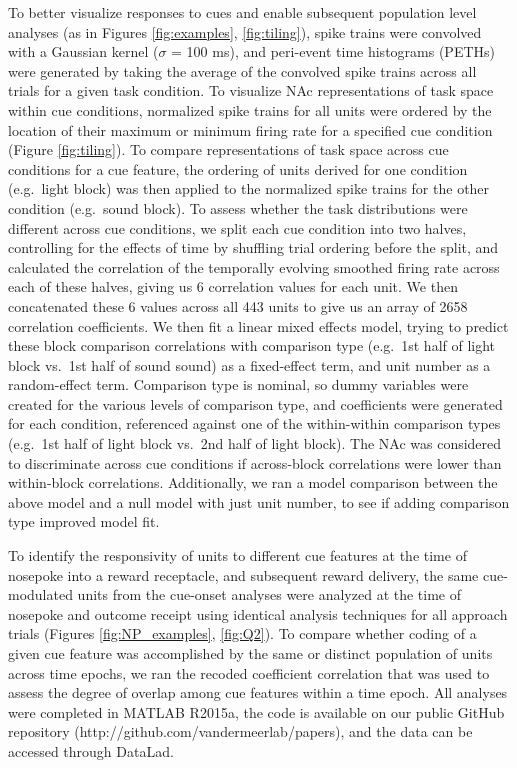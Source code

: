 \documentclass[11pt]{article}
\begin{document}
To better visualize responses to cues and enable subsequent population level analyses (as in Figures \ref{fig:examples}, \ref{fig:tiling}), spike trains were convolved with a Gaussian kernel ($\sigma$ = 100 ms), and peri-event time histograms (PETHs) were generated by taking the average of the convolved spike trains across all trials for a given task condition. To visualize NAc representations of task space within cue conditions, normalized spike trains for all units were ordered by the location of their maximum or minimum firing rate for a specified cue condition (Figure \ref{fig:tiling}). To compare representations of task space across cue conditions for a cue feature, the ordering of units derived for one condition (e.g.\ light block) was then applied to the normalized spike trains for the other condition (e.g.\ sound block). To assess whether the task distributions were different across cue conditions, we split each cue condition into two halves, controlling for the effects of time by shuffling trial ordering before the split, and calculated the correlation of the temporally evolving smoothed firing rate across each of these halves, giving us 6 correlation values for each unit. We then concatenated these 6 values across all 443 units to give us an array of 2658 correlation coefficients. We then fit a linear mixed effects model, trying to predict these block comparison correlations with comparison type (e.g.\ 1st half of light block vs.\ 1st half of sound sound) as a fixed-effect term, and unit number as a random-effect term. Comparison type is nominal, so dummy variables were created for the various levels of comparison type, and coefficients were generated for each condition, referenced against one of the within-within comparison types (e.g.\ 1st half of light block vs.\ 2nd half of light block). The NAc was considered to discriminate across cue conditions if across-block correlations were lower than within-block correlations. Additionally, we ran a model comparison between the above model and a null model with just unit number, to see if adding comparison type improved model fit.

To identify the responsivity of units to different cue features at the time of nosepoke into a reward receptacle, and subsequent reward delivery, the same cue-modulated units from the cue-onset analyses were analyzed at the time of nosepoke and outcome receipt using identical analysis techniques for all approach trials (Figures \ref{fig:NP_examples}, \ref{fig:Q2}). To compare whether coding of a given cue feature was accomplished by the same or distinct population of units across time epochs, we ran the recoded coefficient correlation that was used to assess the degree of overlap among cue features within a time epoch. All analyses were completed in MATLAB R2015a, the code is available on our public GitHub repository (http://github.com/vandermeerlab/papers), and the data can be accessed through DataLad.
\end{document}
